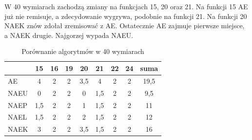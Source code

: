 \documentclass[12pt, a4paper]{article}
\begin{document}
W 40 wymiarach zachodzą zmiany na funkcjach 15, 20 oraz 21. Na funkcji 15 AE już nie remisuje,
a zdecydowanie wygrywa, podobnie na funkcji 21. Na funkcji 20 NAEK znów zdołał zremisować z AE.
Ostatecznie AE zajmuje pierwsze miejsce, a NAEK drugie. Najgorzej wypada NAEU.

\begin{table}[H]
\centering
\begin{tabular}{ l | c | c | c | c | c | c | c | c}
         & 15  & 16 & 19 & 20  & 21  & 22 & 24 & suma \\ \hline
AE       & 4   & 2  & 2  & 3,5 & 4   & 2  & 2  & 19,5 \\ 
NAEU     & 0   & 2  & 2  & 0   & 1,5 & 2  & 2  & 9,5  \\ 
NAEP     & 1,5 & 2  & 2  & 1   & 1,5 & 2  & 2  & 11   \\ 
NAEL     & 1,5 & 2  & 2  & 2   & 1,5 & 2  & 2  & 12   \\
NAEK     & 3   & 2  & 2  & 3,5 & 1,5 & 2  & 2  & 16   \\ 
\end{tabular}
\caption{Porównanie algorytmów w 40 wymiarach}
\label{table:40d}
\end{table}
\end{document}
